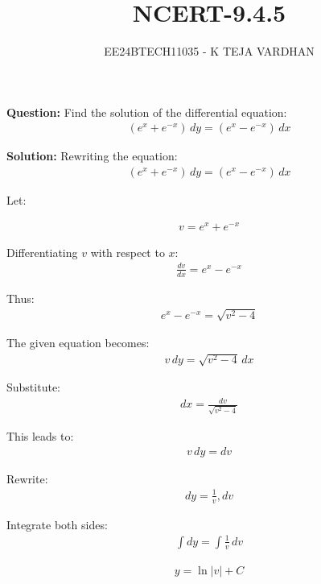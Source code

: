 \documentclass[article]{IEEEtran}
\numberwithin{figure}{enumi}
\begin{document}

\title{NCERT-9.4.5}
\author{EE24BTECH11035 - K TEJA VARDHAN}
{\let\newpage\relax\maketitle}

\noindent\textbf{Question: }  
Find the solution of the differential equation:  
\begin{align}
(e^x + e^{-x}) \, dy = (e^x - e^{-x}) \, dx
\end{align}

\noindent\textbf{Solution:}  
Rewriting the equation:  
\begin{align}
    (e^x + e^{-x}) \, dy = (e^x - e^{-x}) \, dx
\end{align}

\noindent Let:

\begin{align}
    v = e^x + e^{-x}
\end{align}


\noindent Differentiating $v$ with respect to $x$:  
\begin{align}
    \frac{dv}{dx} = e^x - e^{-x}
\end{align}

\noindent Thus:  
\begin{align}
    e^x - e^{-x} = \sqrt{v^2 - 4}
\end{align}

\noindent The given equation becomes:
\begin{align}
    v \, dy = \sqrt{v^2 - 4} \, dx
\end{align}

\noindent   Substitute:
\begin{align}
    dx = \frac{dv}{\sqrt{v^2 - 4}}
\end{align}

\noindent   This leads to:
\begin{align}
   v \, dy = dv
\end{align}

\noindent  Rewrite:
\begin{align}
   dy = \frac{1}{v}, dv
\end{align}

\noindent  Integrate both sides:
\begin{align}
   \int dy = \int \frac{1}{v} \, dv
\end{align}

\begin{align}
   y = \ln|v| + C
\end{align}
\end{document}
